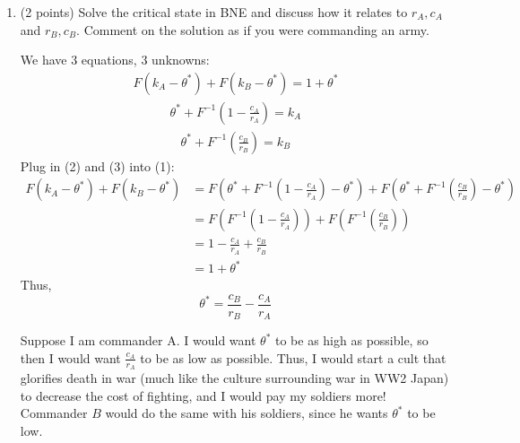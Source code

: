 \documentclass[11pt]{article}
\begin{document}
\begin{enumerate}
\begin{solution}
\end{solution}
    \item (2 points) Solve the critical state in BNE and discuss how it relates to \( r_A, c_A \) and \( r_B, c_B \). Comment on the solution as if you were commanding an army.
\begin{solution}
    We have 3 equations, 3 unknowns:
    \begin{align}
        F(k_A - \theta^*) +F(k_B - \theta^*) = 1 + \theta^*
    \end{align}
    \begin{align}
        \theta^* + F^{-1}(1 - \frac{c_A}{r_A}) = k_A
    \end{align}
    \begin{align}
        \theta^* + F^{-1}(\frac{c_B}{r_B}) = k_B
    \end{align}
    Plug in (2) and (3) into (1):
    \begin{align*}
        F(k_A - \theta^*) +F(k_B - \theta^*) &= F(\theta^* + F^{-1}(1 -\frac{c_A}{r_A}) - \theta^*) +F( \theta^* + F^{-1}(\frac{c_B}{r_B}) - \theta^*)\\
        &= F(F^{-1}(1 - \frac{c_A}{r_A})) + F(F^{-1}(\frac{c_B}{r_B}))\\
        &= 1 - \frac{c_A}{r_A} + \frac{c_B}{r_B}\\
        &= 1 + \theta^*
    \end{align*}
    Thus,
    \[\boxed{\theta^* = \frac{c_B}{r_B}- \frac{c_A}{r_A}} \]

Suppose I am commander A. I would want $\theta^*$ to be as high as possible, so then I would want $\frac{c_A}{r_A}$ to be as low as possible. Thus, I would start a cult that glorifies death in war (much like the culture surrounding war in WW2 Japan) to decrease the cost of fighting, and I would pay my soldiers more! Commander $B$ would do the same with his soldiers, since he wants $\theta^*$ to be low.
\end{solution}
\end{enumerate}
\end{document}
